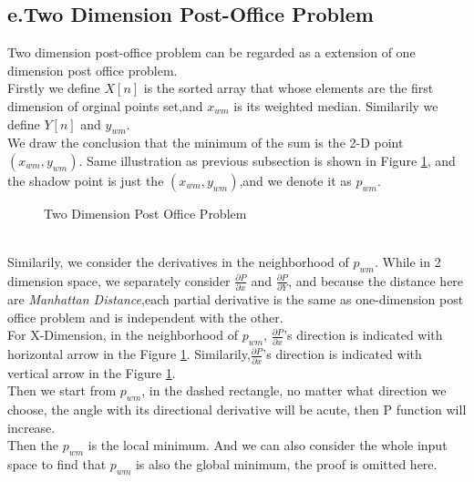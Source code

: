\documentclass[oneside]{homework} %
\begin{document}
\subsection* {e.Two Dimension Post-Office Problem}
Two dimension post-office problem can be regarded as a extension of one dimension post office problem. \\
Firstly we define $X[n]$ is the sorted array that whose elements are the first dimension of orginal points set,and $x_{wm}$ is its weighted median. Similarily we define $Y[n]$ and $y_{wm}$. \\
We draw the conclusion that the minimum of the sum is the 2-D point $(x_{wm},y_{wm})$.
Same illustration as previous subsection is shown in Figure \ref{fig:2dim}, and the shadow point is just the $(x_{wm},y_{wm})$,and we denote it as $p_{wm}$.
\begin{figure}[t]
  \centering
  \caption{Two Dimension Post Office Problem}
  \label{fig:2dim}
\end{figure}
\\ Similarily, we consider the derivatives in the neighborhood of $p_{wm}$. While in 2 dimension space, we separately consider $\frac{\partial P}{\partial x}$ and $\frac{\partial P}{\partial Y}$, and because the distance here are \emph{Manhattan Distance},each partial derivative is the same as one-dimension post office problem and is independent with the other.
\\ For X-Dimension, in the neighborhood of $p_{wm}$, $\frac{\partial P}{\partial x}$'s direction is indicated with horizontal arrow in the Figure \ref{fig:2dim}. Similarily,$\frac{\partial P}{\partial x}$'s direction is indicated with vertical arrow in the Figure \ref{fig:2dim}. \\ Then we start from $p_{wm}$, in the dashed rectangle, no matter what direction we choose, the angle with its directional derivative will be acute, then P function will increase.\\
Then the $p_{wm}$ is the local minimum. And we can also consider the whole input space to find that $p_{wm}$ is also the global minimum, the proof is omitted here.
\end{document}
